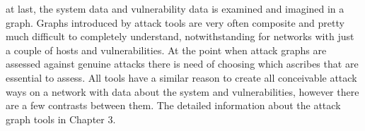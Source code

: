 at last, the system data and vulnerability data is examined and imagined in a graph. Graphs introduced by attack tools are very often composite and pretty much difficult to completely understand, notwithstanding for networks with just a couple of hosts and vulnerabilities. At the point when attack graphs are assessed against genuine attacks there is need of choosing which ascribes that are essential to assess. All tools have a similar reason to create all conceivable attack ways on a network with data about the system and vulnerabilities, however there are a few contrasts between them. The detailed information about the attack graph tools in Chapter 3.	






